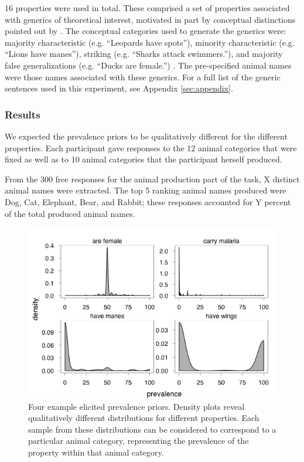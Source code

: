 \documentclass[10pt,letterpaper]{article}
\begin{document}
16 properties were used in total. These comprised a set of properties associated with generics of theoretical interest, motivated in part by conceptual distinctions pointed out by . The conceptual categories used to generate the generics were: majority characteristic (e.g. ``Leopards have spots''), minority characteristic (e.g. ``Lions have manes''), striking (e.g. ``Sharks attack swimmers.''), and majority false generalizations (e.g. ``Ducks are female.'') \cite{Prasada2013}. The pre-specified animal names were those names associated with these generics.  For a full list of the generic sentences used in this experiment, see Appendix \ref{sec:appendix}.

\subsubsection{Results}

We expected the prevalence priors to be qualitatively different for the different properties. Each participant gave responses to the 12 animal categories that were fixed as well as to 10 animal categories that the participant herself produced. 

From the 300 free responses for the animal production part of the task, X distinct animal names were extracted. The top 5 ranking animal names produced were Dog, Cat, Elephant, Bear, and Rabbit; these responses accounted for Y percent of the total produced animal names.

\begin{figure}
\centering
    \includegraphics[width=0.8\columnwidth]{priors-exp1a-4types}
    \caption{Four example elicited prevalence priors. Density plots reveal qualitatively different distributions for different properties. Each sample from these distributions can be considered to correspond to a particular animal category, representing the prevalence of the property within that animal category.}
  \label{fig:priors1a}
\end{figure}
\end{document}
